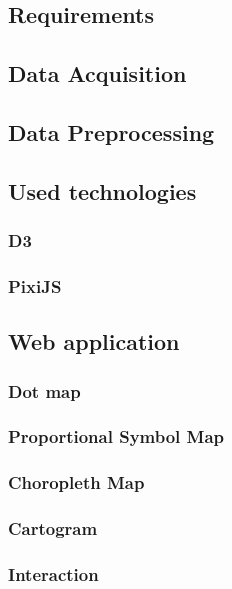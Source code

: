 \subsection{Requirements}


\subsection{Data Acquisition}
\label{s:data-acquisition}


\subsection{Data Preprocessing}
\label{s:data-preprocessing}


\subsection{Used technologies}
\subsubsection{D3}
\subsubsection{PixiJS}

\subsection{Web application}
\label{s:web-application}



\subsubsection{Dot map}
\subsubsection{Proportional Symbol Map}
\subsubsection{Choropleth Map}
\subsubsection{Cartogram}
\subsubsection{Interaction}


